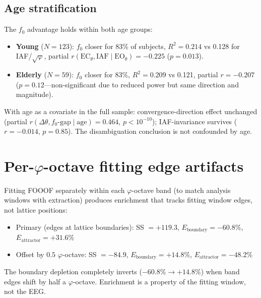\documentclass[11pt,a4paper]{article}
\newcommand{\phisym}{\varphi}
\newcommand{\fzero}{f_0}
\begin{document}
\subsection{Age stratification}

The $\fzero$ advantage holds within both age groups:

\begin{itemize}
    \item \textbf{Young} ($N = 123$): $\fzero$ closer for 83\% of subjects, $R^2 = 0.214$ vs 0.128 for IAF/$\sqrt{\phisym}$, partial $r(\text{EC}_\theta, \text{IAF} \mid \text{EO}_\theta) = -0.225$ ($p = 0.013$).
    \item \textbf{Elderly} ($N = 59$): $\fzero$ closer for 83\%, $R^2 = 0.209$ vs 0.121, partial $r = -0.207$ ($p = 0.12$---non-significant due to reduced power but same direction and magnitude).
\end{itemize}

With age as a covariate in the full sample: convergence-direction effect unchanged (partial $r(\Delta\theta, \fzero\text{-gap} \mid \text{age}) = 0.464$, $p < 10^{-10}$); IAF-invariance survives ($r = -0.014$, $p = 0.85$). The disambiguation conclusion is not confounded by age.

\section{Per-$\phisym$-octave fitting edge artifacts}
\label{app:peroctave}

Fitting FOOOF separately within each $\phisym$-octave band (to match analysis windows with extraction) produces enrichment that tracks fitting window edges, not lattice positions:
\begin{itemize}
    \item Primary (edges at lattice boundaries): SS $= +119.3$, $E_{\text{boundary}} = -60.8\%$, $E_{\text{attractor}} = +31.6\%$
    \item Offset by $0.5$ $\phisym$-octave: SS $= -84.9$, $E_{\text{boundary}} = +14.8\%$, $E_{\text{attractor}} = -48.2\%$
\end{itemize}
The boundary depletion completely inverts ($-60.8\% \to +14.8\%$) when band edges shift by half a $\phisym$-octave. Enrichment is a property of the fitting window, not the EEG.


\printbibliography
\end{document}
